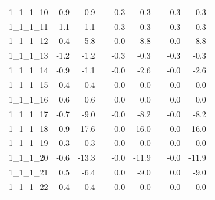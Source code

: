 \begin{longtable}{lrrcrrcrr}
1\_1\_1\_10      &                -0.9 &                  -0.9 &&                 -0.3 &                   -0.3 &&                 -0.3 &                   -0.3 \\
1\_1\_1\_11      &                -1.1 &                  -1.1 &&                 -0.3 &                   -0.3 &&                 -0.3 &                   -0.3 \\
1\_1\_1\_12      &                 0.4 &                  -5.8 &&                  0.0 &                   -8.8 &&                  0.0 &                   -8.8 \\
1\_1\_1\_13      &                -1.2 &                  -1.2 &&                 -0.3 &                   -0.3 &&                 -0.3 &                   -0.3 \\
1\_1\_1\_14      &                -0.9 &                  -1.1 &&                 -0.0 &                   -2.6 &&                 -0.0 &                   -2.6 \\
1\_1\_1\_15      &                 0.4 &                   0.4 &&                  0.0 &                    0.0 &&                  0.0 &                    0.0 \\
1\_1\_1\_16      &                 0.6 &                   0.6 &&                  0.0 &                    0.0 &&                  0.0 &                    0.0 \\
1\_1\_1\_17      &                -0.7 &                  -9.0 &&                 -0.0 &                   -8.2 &&                 -0.0 &                   -8.2 \\
1\_1\_1\_18      &                -0.9 &                 -17.6 &&                 -0.0 &                  -16.0 &&                 -0.0 &                  -16.0 \\
1\_1\_1\_19      &                 0.3 &                   0.3 &&                  0.0 &                    0.0 &&                  0.0 &                    0.0 \\
1\_1\_1\_20      &                -0.6 &                 -13.3 &&                 -0.0 &                  -11.9 &&                 -0.0 &                  -11.9 \\
1\_1\_1\_21      &                 0.5 &                  -6.4 &&                  0.0 &                   -9.0 &&                  0.0 &                   -9.0 \\
1\_1\_1\_22      &                 0.4 &                   0.4 &&                  0.0 &                    0.0 &&                  0.0 &                    0.0 \\

\end{longtable}

